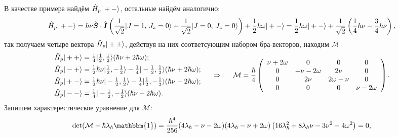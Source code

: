  В качестве примера найдём $\hat{H}_p | +- \rangle$, остальные найдём аналогично:
 \begin{equation*}
     \hat{H}_p | +- \rangle =
    \hbar \nu \hat{\mbox{\boldmath $S$}} \cdot \hat{\mbox{\boldmath $I$}} \left(\frac{1}{\sqrt{2}} | J=1,\, J_z=0 \rangle + \frac{1}{\sqrt{2}} | J=0,\, J_z=0 \rangle\right) + \frac{1}{2} \hbar \omega | +- \rangle 
     = \frac{1}{2} \hbar \omega | +- \rangle + 
     \frac{1}{\sqrt{2}} \left(
        \frac{1}{4} \hbar \nu - \frac{3}{4} \hbar \nu
     \right),
 \end{equation*}
 так получаем четыре вектора $\hat{H}_p | \pm \pm \rangle$,
 действуя на них соответсующим набором бра-векторов, находим $\mathcal M$
\begin{equation*}
    \left.\begin{aligned}
            \hat{H}_p | ++ \rangle &= 
    \textstyle \frac{1}{4} |\textstyle \frac{1}{2},\textstyle \frac{1}{2}\rangle  ( \hbar \nu +2  \hbar \omega );
    \\
    \hat{H}_p | -+ \rangle &= 
    \textstyle \frac{1}{2}  \hbar \nu  |\textstyle \frac{1}{2},-\textstyle \frac{1}{2}\rangle -\textstyle \frac{1}{4} |-\textstyle \frac{1}{2},\textstyle \frac{1}{2}\rangle  ( \hbar \nu +2  \hbar \omega );
    \\
    \hat{H}_p | +- \rangle &= 
    \textstyle \frac{1}{2}  \hbar \nu  |-\textstyle \frac{1}{2},\textstyle \frac{1}{2}\rangle -\textstyle \frac{1}{4} |\textstyle \frac{1}{2},-\textstyle \frac{1}{2}\rangle  ( \hbar \nu -2  \hbar \omega ) ;
    \\
    \hat{H}_p | -- \rangle &= 
    \textstyle \frac{1}{4} |-\textstyle \frac{1}{2},-\textstyle \frac{1}{2}\rangle  ( \hbar \nu -2  \hbar \omega ).
    \end{aligned}\right.
    \hspace{0.5cm} \Rightarrow \hspace{0.5cm}
        \mathcal M = \frac{\hbar}{4} \left(
\begin{array}{cccc}
 \nu +2 \omega  & 0 & 0 & 0 \\
 0 & -\nu -2 \omega  & 2 \nu  & 0 \\
 0 & 2 \nu  & 2 \omega -\nu  & 0 \\
 0 & 0 & 0 & \nu -2 \omega  \\
\end{array}
\right).
\end{equation*}
Запишем характерестическое уравнение для $\mathcal M$:
\begin{equation*}
    \det(\mathcal M - \hbar \lambda_\hbar \mathbbm{1}) = \frac{\hbar^4}{256} (4 \lambda_\hbar -\nu -2 \omega ) (4 \lambda_\hbar -\nu +2 \omega ) \left(16 \lambda_\hbar ^2+8 \lambda_\hbar  \nu -3 \nu ^2-4 \omega ^2\right) = 0,
\end{equation*}
